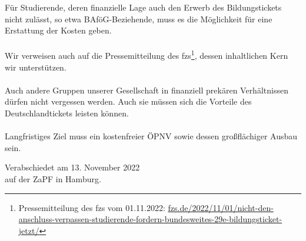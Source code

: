 \documentclass[DIV=calc]{scrartcl}
\begin{document}
Für Studierende, deren finanzielle Lage auch den Erwerb des Bildungstickets nicht zulässt, so etwa BAföG-Beziehende, muss es die Möglichkeit für eine Erstattung der Kosten geben.\\\\
Wir verweisen auch auf die Pressemitteilung des fzs\footnote{Pressemitteilung des fzs vom 01.11.2022: \href{https://www.fzs.de/2022/11/01/nicht-den-anschluss-verpassen-studierende-fordern-bundesweites-29e-bildungsticket-jetzt/}{fzs.de/2022/11/01/nicht-den-anschluss-verpassen-studierende-fordern-bundesweites-29e-bildungsticket-jetzt/}}, dessen inhaltlichen Kern wir unterstützen.\\\\
Auch andere Gruppen unserer Gesellschaft in finanziell prekären Verhältnissen dürfen nicht vergessen werden. Auch sie müssen sich die Vorteile des Deutschlandtickets leisten können.\\\\
Langfristiges Ziel muss ein kostenfreier ÖPNV sowie dessen großflächiger Ausbau sein.
    
\vspace{1cm} 

\vfill
\begin{flushright}
	Verabschiedet am 13. November 2022 \\
	auf der ZaPF in Hamburg.
\end{flushright}
\end{document}
